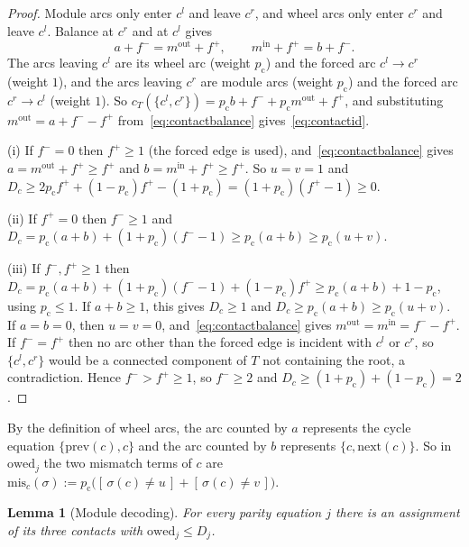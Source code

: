 \documentclass[11pt]{amsart}
\newtheorem{lemma}[theorem]{Lemma}
\theoremstyle{definition}
\theoremstyle{remark}
\numberwithin{equation}{section}
\newcommand{\iv}[1]{[\,#1\,]}
\newcommand{\nxt}{\mathrm{next}}
\newcommand{\prv}{\mathrm{prev}}
\newcommand{\owed}{\mathrm{owed}}
\newcommand{\mis}{\mathrm{mis}}
\newcommand{\pc}{p_{\mathrm{c}}}
\begin{document}
\begin{proof}
Module arcs only enter $c^l$ and leave $c^r$, and wheel arcs only enter $c^r$ and leave $c^l$. Balance at $c^r$ and at $c^l$ gives
\begin{equation}\label{eq:contactbalance}
a+f^-=m^{\mathrm{out}}+f^+,\qquad m^{\mathrm{in}}+f^+=b+f^- .
\end{equation}
The arcs leaving $c^l$ are its wheel arc (weight $\pc$) and the forced arc $c^l\to c^r$ (weight $1$), and the arcs leaving $c^r$ are module arcs (weight $\pc$) and the forced arc $c^r\to c^l$ (weight $1$). So $c_T(\{c^l,c^r\})=\pc b+f^-+\pc m^{\mathrm{out}}+f^+$, and substituting $m^{\mathrm{out}}=a+f^--f^+$ from~\eqref{eq:contactbalance} gives~\eqref{eq:contactid}.

(i) If $f^-=0$ then $f^+\ge1$ (the forced edge is used), and~\eqref{eq:contactbalance} gives $a=m^{\mathrm{out}}+f^+\ge f^+$ and $b=m^{\mathrm{in}}+f^+\ge f^+$. So $u=v=1$ and $D_c\ge2\pc f^++(1-\pc)f^+-(1+\pc)=(1+\pc)(f^+-1)\ge0$.

(ii) If $f^+=0$ then $f^-\ge1$ and $D_c=\pc(a+b)+(1+\pc)(f^--1)\ge\pc(a+b)\ge\pc(u+v)$.

(iii) If $f^-,f^+\ge1$ then $D_c=\pc(a+b)+(1+\pc)(f^--1)+(1-\pc)f^+\ge\pc(a+b)+1-\pc$, using $\pc\le1$. If $a+b\ge1$, this gives $D_c\ge1$ and $D_c\ge\pc(a+b)\ge\pc(u+v)$. If $a=b=0$, then $u=v=0$, and~\eqref{eq:contactbalance} gives $m^{\mathrm{out}}=m^{\mathrm{in}}=f^--f^+$. If $f^-=f^+$ then no arc other than the forced edge is incident with $c^l$ or $c^r$, so $\{c^l,c^r\}$ would be a connected component of $T$ not containing the root, a contradiction. Hence $f^->f^+\ge1$, so $f^-\ge2$ and $D_c\ge(1+\pc)+(1-\pc)=2$.
\end{proof}

By the definition of wheel arcs, the arc counted by $a$ represents the cycle equation $\{\prv(c),c\}$ and the arc counted by $b$ represents $\{c,\nxt(c)\}$. So in $\owed_j$ the two mismatch terms of $c$ are $\mis_c(\sigma):=\pc\bigl(\iv{\sigma(c)\ne u}+\iv{\sigma(c)\ne v}\bigr)$.

\begin{lemma}[Module decoding]\label{lem:module}
For every parity equation $j$ there is an assignment of its three contacts with $\owed_j\le D_j$.
\end{lemma}
\end{document}
